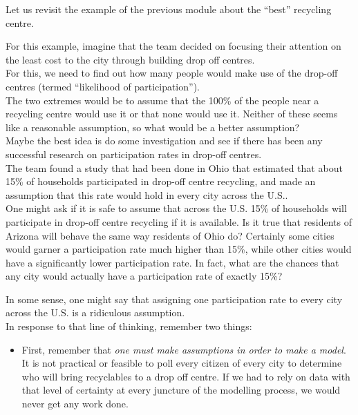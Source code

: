 \begin{siam}
\begin{example}

Let us revisit the example of the previous module about the ``best'' recycling centre.

For this example, imagine that the team decided on focusing their attention on the least cost to the city through building drop off centres. \\

For this, we need to find out how many people would make use of the drop-off centres (termed ``likelihood of participation'').  \\

The two extremes would be to assume that the 100\% of the people near a recycling centre would use it or that none would use it. Neither of these seems like a reasonable assumption, so what would be a better assumption?  \\

Maybe the best idea is do some investigation and see if there has been any successful research on participation rates in drop-off centres.  \\

The team found a study that had been done in Ohio that estimated that about 15\% of households participated in drop-off centre recycling, and made an assumption that this rate would hold in every city across the U.S.. \\

One might ask if it is safe to assume that across the U.S. 15\% of households will participate in drop-off centre recycling if it is available. Is it true that residents of Arizona will behave the same way residents of Ohio do? Certainly some cities would garner a participation rate much higher than 15\%, while other cities would have a significantly lower participation rate. In fact, what are the chances that any city would actually have a participation rate of exactly 15\%?

In some sense, one might say that assigning one participation rate to every city across the U.S. is a ridiculous assumption. \\

In response to that line of thinking, remember two things:
\begin{itemize}
	\item First, remember that \emph{one must make assumptions in order to make a model}. It is not practical or feasible to poll every citizen of every city to determine who will bring recyclables to a drop off centre. If we had to rely on data with that level of certainty at every juncture of the modelling process, we would never get any work done.


\end{itemize}
\end{example}
\end{siam}
